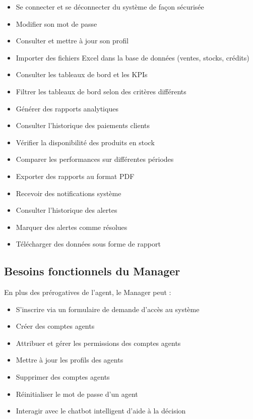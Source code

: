 \documentclass[a4paper,12pt]{report}
\begin{document}
\begin{itemize}

\item Se connecter et se déconnecter du système de façon sécurisée
\item Modifier son mot de passe
\item Consulter et mettre à jour son profil
\item Importer des fichiers Excel dans la base de données (ventes, stocks, crédits)
\item Consulter les tableaux de bord et les KPIs
\item Filtrer les tableaux de bord selon des critères différents
\item Générer des rapports analytiques
\item Consulter l'historique des paiements clients
\item Vérifier la disponibilité des produits en stock
\item Comparer les performances sur différentes périodes
\item Exporter des rapports au format PDF 
\item Recevoir des notifications système
\item Consulter l'historique des alertes
\item Marquer des alertes comme résolues
\item Télécharger des données sous forme de rapport

\end{itemize}

\subsection{Besoins fonctionnels du Manager}

En plus des prérogatives de l'agent, le Manager peut :

\begin{itemize}

\item S'inscrire via un formulaire de demande d'accès au système
\item Créer des comptes agents
\item Attribuer et gérer les permissions des comptes agents
\item Mettre à jour les profils des agents
\item Supprimer des comptes agents
\item Réinitialiser le mot de passe d'un agent
\item Interagir avec le chatbot intelligent d'aide à la décision

\end{itemize}
\end{document}
